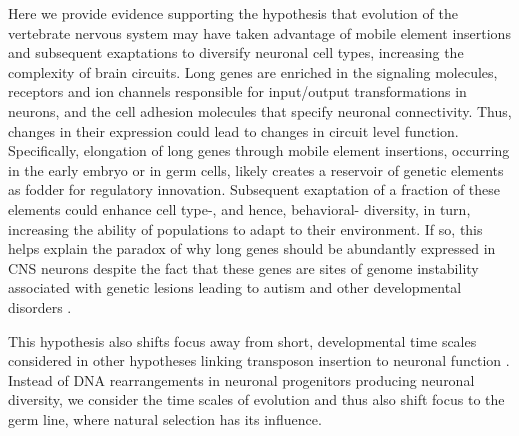 Here we provide evidence supporting the hypothesis that evolution of the vertebrate nervous system may have taken advantage of mobile element insertions and subsequent exaptations to diversify neuronal cell types, increasing the complexity of brain circuits. Long genes are enriched in the signaling molecules, receptors and ion channels responsible for input/output transformations in neurons, and the cell adhesion molecules that specify neuronal connectivity. Thus, changes in their expression could lead to changes in circuit level function. Specifically, elongation of long genes through mobile element insertions, occurring in the early embryo or in germ cells, likely creates a reservoir of genetic elements as fodder for regulatory innovation. Subsequent exaptation of a fraction of these elements could enhance cell type-, and hence, behavioral- diversity, in turn, increasing the ability of populations to adapt to their environment. If so, this helps explain the paradox of why long genes should be abundantly expressed in CNS neurons despite the fact that these genes are sites of genome instability associated with genetic lesions leading to autism and other developmental disorders \citep{Wei_2016}. 

This hypothesis also shifts focus away from short, developmental time scales considered in other hypotheses linking transposon insertion to neuronal function \citep{Muotri_2005,Richardson_2014,Perrat_2013}. Instead of DNA rearrangements in neuronal progenitors producing neuronal diversity, we consider the time scales of evolution and thus also shift focus to the germ line, where natural selection has its influence. 



